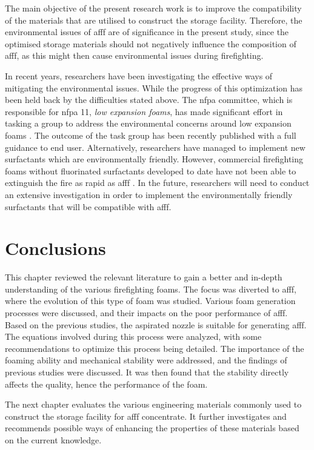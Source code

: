 The main objective of the present research work is to improve the compatibility of the materials that are utilised to construct the storage facility. Therefore, the environmental issues of \acrshort{afff} are of significance in the present study, since the optimised storage materials should not negatively influence the composition of \acrshort{afff}, as this might then cause environmental issues during firefighting. 

In recent years, researchers have been investigating the effective ways of mitigating the environmental issues. While the progress of this optimization has been held back by the difficulties stated above. The \acrshort{nfpa} committee, which is responsible for \acrshort{nfpa} 11, \emph{low expansion foams}, has made significant effort in tasking a group to address the environmental concerns around low expansion foams \cite{scheffey1995evaluating}. The outcome of the task group has been recently published with a full guidance to end user\cite{scheffey1995evaluating}. Alternatively, researchers have managed to implement new surfactants which are environmentally friendly. However, commercial firefighting foams without fluorinated surfactants developed to date have not been able to extinguish the fire as rapid as \acrshort{afff} \cite{hinnant2017influence}. In the future, researchers will need to conduct an extensive investigation in order to implement the environmentally friendly surfactants that will be compatible with \acrshort{afff}.  

\section{Conclusions}
This chapter reviewed the relevant literature to gain a better and in-depth understanding of the various firefighting foams. The focus was diverted to \acrshort{afff}, where the evolution of this type of foam was studied. Various foam generation processes were discussed, and their impacts on the poor performance of \acrshort{afff}. Based on the previous studies, the aspirated nozzle is suitable for generating \acrshort{afff}. The equations involved during this process were analyzed, with some recommendations to optimize this process being detailed. The importance of the foaming ability and mechanical stability were addressed, and the findings of previous studies were discussed. It was then found that the stability directly affects the quality, hence the performance of the foam.

The next chapter evaluates the various engineering materials commonly used to construct the storage facility for \acrshort{afff} concentrate. It further investigates and recommends possible ways of enhancing the properties of these materials based on the current knowledge.